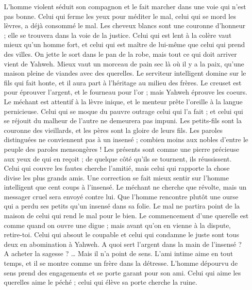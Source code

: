 \begin{multicols}{2}
L'homme violent séduit son compagnon et le fait marcher dans une voie qui n'est pas bonne.
Celui qui ferme les yeux pour méditer le mal, celui qui se mord les lèvres, a déjà consommé le mal.
Les cheveux blancs sont une couronne d'honneur ; elle se trouvera dans la voie de la justice.
Celui qui est lent à la colère vaut mieux qu’un homme fort, et celui qui est maître de lui-même que celui qui prend des villes.
On jette le sort dans le pan de la robe, mais tout ce qui doit arriver vient de Yahweh.
\VerseOne{}Mieux vaut un morceau de pain sec là où il y a la paix, qu'une maison pleine de viandes avec des querelles.
Le serviteur intelligent domine sur le fils qui fait honte, et il aura part à l'héritage au milieu des frères.
Le creuset est pour éprouver l'argent, et le fourneau pour l'or ; mais Yahweh éprouve les coeurs.
Le méchant est attentif à la lèvre inique, et le menteur prête l’oreille à la langue pernicieuse.
Celui qui se moque du pauvre outrage celui qui l’a fait ; et celui qui se réjouit du malheur de l’autre ne demeurera pas impuni.
Les petits-fils sont la couronne des vieillards, et les pères sont la gloire de leurs fils.
Les paroles distinguées ne conviennent pas à un insensé ; combien moins aux nobles d'entre le peuple des paroles mensongères !
Les présents sont comme une pierre précieuse aux yeux de qui en reçoit ; de quelque côté qu'ils se tournent, ils réussissent.
Celui qui couvre les fautes cherche l'amitié, mais celui qui rapporte la chose divise les plus grands amis.
Une correction se fait mieux sentir sur l'homme intelligent que cent coups à l’insensé.
Le méchant ne cherche que révolte, mais un messager cruel sera envoyé contre lui.
Que l'homme rencontre plutôt une ourse qui a perdu ses petits qu'un insensé dans sa folie.
Le mal ne partira point de la maison de celui qui rend le mal pour le bien.
Le commencement d'une querelle est comme quand on ouvre une digue ; mais avant qu'on en vienne à la dispute, retire-toi.
Celui qui absout le coupable et celui qui condamne le juste sont tous deux en abomination à Yahweh.
A quoi sert l’argent dans la main de l’insensé ? A acheter la sagesse ? … Mais il n’a point de sens.
L'ami intime aime en tout temps, et il se montre comme un frère dans la détresse.
L’homme dépourvu de sens prend des engagements et se porte garant pour son ami.
Celui qui aime les querelles aime le péché ; celui qui élève sa porte cherche la ruine.

\end{multicols}
